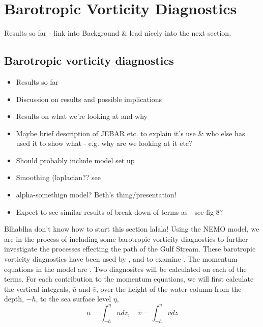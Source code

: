 \documentclass[..\EOYR.tex]{subfiles}
\begin{document}
\section{Barotropic Vorticity Diagnostics}

Results so far - link into Background \& lead nicely into the next section.
\subsection{Barotropic vorticity diagnostics}
\begin{itemize}
  \item Results so far
  \item Discussion on results and possible implications
  \item Results on what we're looking at and why
  \item Maybe brief description of JEBAR etc. to explain it's use \& who else has used it to show what - e.g. why are we looking at it etc?
  \item Should probably include model set up
  \item Smoothing (laplacian?? see \citep{Bell1999}
  \item alpha-somethign model? Beth's thing/presentation!
  \item Expect to see similar results of break down of terms as \citep{Ezer2016b} - see fig 8?
\end{itemize}

Blhablha don't know how to start this section lalala!
Using the NEMO model, we are in the process of including some barotropic vorticity diagnostics to further investigate the processes effecting the path of the Gulf Stream. These barotropic vorticity diagnostics have been used by \citep{Bell1999},\citep{Gula???} and  to examine . The momentum equations in the model are . Two diagnositcs will be calculated on each of the  terms.  
For each contribution to the momentum equations, we will first calculate the vertical integrals, $\bar{u}$ and $\bar{v}$, over the height of the water column from the depth, $-h$, to the sea surface level $\eta$,
\begin{equation}
	\bar{u} = \int_{-h}^{\eta} u dz ,\quad \bar{v} = \int_{-h}^{\eta} v dz 
\end {equation}
\end{document}
